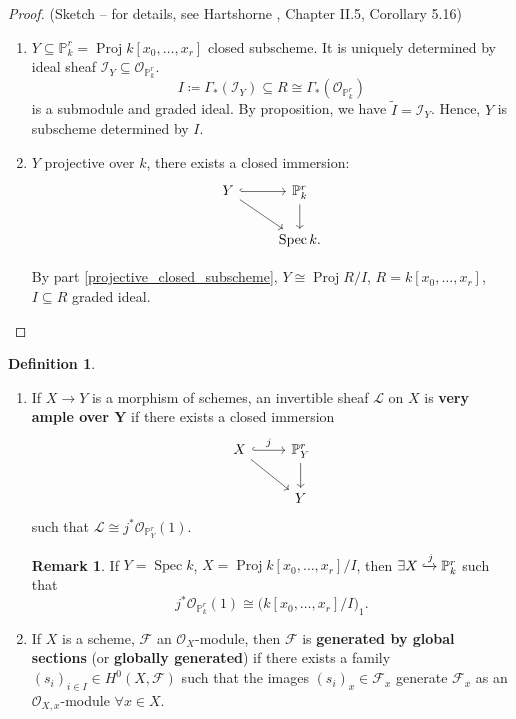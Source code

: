 \documentclass[12pt]{article}
\DeclareMathOperator{\Spec}{Spec}
\DeclareMathOperator{\Proj}{Proj}
\theoremstyle{definition}
\newtheorem*{definition}{Definition}
\newtheorem*{remark}{Remark}
\begin{document}
\begin{proof}
(Sketch -- for details, see Hartshorne \cite{hartshorne2013algebraic}, Chapter II.5, Corollary 5.16)

\begin{enumerate}[label=\arabic*)]
\item $Y\subseteq\mathbb P_k^r=\Proj k[x_0,\ldots,x_r]$ closed subscheme. It is uniquely determined by ideal sheaf $\mathcal I_Y\subseteq\mathcal O_{\mathbb P_k^r}$.
\[I\coloneqq\Gamma_*(\mathcal I_Y)\subseteq R\cong\Gamma_*(\mathcal O_{\mathbb P_k^r})\]
is a submodule and graded ideal. By proposition, we have $\widetilde I=\mathcal I_Y$. Hence, $Y$ is subscheme determined by $I$.

\item $Y$ projective over $k$, there exists a closed immersion:
\[\begin{tikzcd}Y\arrow[r,hook]\arrow[rd]&\mathbb P_k^r\arrow[d]\\&\Spec k.\end{tikzcd}\]

By part \ref{projective_closed_subscheme}, $Y\cong\Proj R/I$, $R=k[x_0,\ldots,x_r]$, $I\subseteq R$ graded ideal.
\end{enumerate}
\end{proof}

\begin{definition}
\begin{enumerate}[label=\arabic*)]
\item If $X\rightarrow Y$ is a morphism of schemes, an invertible sheaf $\mathcal L$ on $X$ is \textbf{very ample over $\boldsymbol Y$} if there exists a closed immersion
\[\begin{tikzcd}X\arrow[r,hook,"j"]\arrow[rd]&\mathbb P_Y^r\arrow[d]\\&Y\end{tikzcd}\]
such that $\mathcal L\cong j^*\mathcal O_{\mathbb P_Y^r}(1)$.

\begin{remark}
If $Y=\Spec k$, $X=\Proj k[x_0,\ldots,x_r]/I$, then $\exists X\xhookrightarrow{j}\mathbb P_k^r$ such that
\[j^*\mathcal O_{\mathbb P_k^r}(1)\cong\big(k[x_0,\ldots,x_r]/I\big)_1.\]
\end{remark}

\item If $X$ is a scheme, $\mathcal F$ an $\mathcal O_X$-module, then $\mathcal F$ is \textbf{generated by global sections} (or \textbf{globally generated}) if there exists a family $(s_i)_{i\in I}\in H^0(X,\mathcal F)$ such that the images $(s_i)_x\in\mathcal F_x$ generate $\mathcal F_x$ as an $\mathcal O_{X,x}$-module $\forall x\in X$.
\end{enumerate}
\end{definition}
\end{document}
